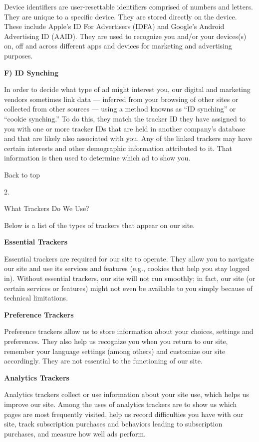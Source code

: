 Device identifiers are user-resettable identifiers comprised of numbers
and letters. They are unique to a specific device. They are stored
directly on the device. These include Apple's ID For Advertisers (IDFA)
and Google's Android Advertising ID (AAID). They are used to recognize
you and/or your devices(s) on, off and across different apps and devices
for marketing and advertising purposes.

\textbf{F) ID Synching}

In order to decide what type of ad might interest you, our digital and
marketing vendors sometimes link data --- inferred from your browsing of
other sites or collected from other sources --- using a method knowns as
``ID synching'' or ``cookie synching.'' To do this, they match the
tracker ID they have assigned to you with one or more tracker IDs that
are held in another company's database and that are likely also
associated with you. Any of the linked trackers may have certain
interests and other demographic information attributed to it. That
information is then used to determine which ad to show you.

Back to top

2.

What Trackers Do We Use?

Below is a list of the types of trackers that appear on our site.

\textbf{Essential Trackers}

Essential trackers are required for our site to operate. They allow you
to navigate our site and use its services and features (e.g., cookies
that help you stay logged in). Without essential trackers, our site will
not run smoothly; in fact, our site (or certain services or features)
might not even be available to you simply because of technical
limitations.

\textbf{Preference Trackers}

Preference trackers allow us to store information about your choices,
settings and preferences. They also help us recognize you when you
return to our site, remember your language settings (among others) and
customize our site accordingly. They are not essential to the
functioning of our site.

\textbf{Analytics Trackers}

Analytics trackers collect or use information about your site use, which
helps us improve our site. Among the uses of analytics trackers are to
show us which pages are most frequently visited, help us record
difficulties you have with our site, track subscription purchases and
behaviors leading to subscription purchases, and measure how well ads
perform.


